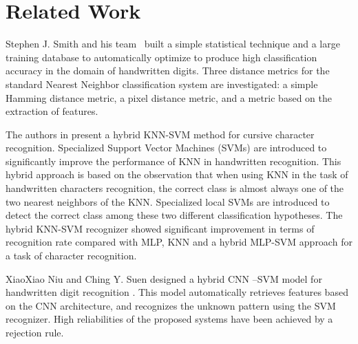 

\section{Related Work}
\label{RelWork}

Stephen J. Smith and his team~\cite{smith1994handwritten} built a simple statistical technique and a large training database to automatically optimize to produce high classification accuracy in the domain of handwritten digits.  Three distance metrics for the standard Nearest Neighbor classification system are investigated: a simple Hamming distance metric, a pixel distance metric, and a metric based on the extraction of features. 

%

The authors in \cite{zanchettin2012knn} present a hybrid KNN-SVM method for cursive character recognition. Specialized Support Vector Machines (SVMs) are introduced to significantly improve the performance of KNN in handwritten recognition. This hybrid approach is based on the observation that when using KNN in the task of handwritten characters recognition, the correct class is almost always one of the two nearest neighbors of the KNN. Specialized local SVMs are introduced to detect the correct class among these two different classification hypotheses. The hybrid KNN-SVM recognizer showed significant improvement in terms of recognition rate compared with MLP, KNN and a hybrid MLP-SVM approach for a task of character recognition.


XiaoXiao Niu and Ching Y. Suen \cite{niu2012novel} designed a hybrid CNN –SVM model for handwritten digit recognition \cite{hall2010mapreduce}. This model automatically retrieves
features based on the CNN architecture, and recognizes the unknown pattern using the SVM recognizer. High reliabilities of the proposed systems have been achieved by a rejection rule. 

